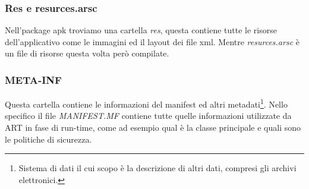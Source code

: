 \subsubsection{Res e resurces.arsc}
Nell'package apk troviamo una cartella \textit{res}, questa contiene tutte le risorse dell'applicativo come le immagini ed il layout dei file xml. Mentre \textit{resurces.arsc} è un file di risorse questa volta però compilate. 
\subsubsection{META-INF}
Questa cartella contiene le informazioni del manifest ed altri metadati\footnote{Sistema di dati il cui scopo è la descrizione di altri dati, compresi gli archivi elettronici.}. Nello specifico il file \textit{MANIFEST.MF} contiene tutte quelle informazioni utilizzate da ART in fase di run-time, come ad esempio qual è la classe principale e quali sono le politiche di sicurezza. 










